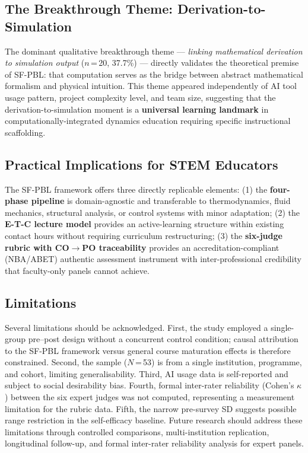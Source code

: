 \documentclass[12pt, a4paper]{article}
\begin{document}
\subsection{The Breakthrough Theme: Derivation-to-Simulation}

The dominant qualitative breakthrough theme --- \textit{linking
mathematical derivation to simulation output} ($n$\,=\,20, 37.7\%)
--- directly validates the theoretical premise of SF-PBL: that
computation serves as the bridge between abstract mathematical
formalism and physical intuition. This theme appeared independently
of AI tool usage pattern, project complexity level, and team size,
suggesting that the derivation-to-simulation moment is a
\textbf{universal learning landmark} in computationally-integrated
dynamics education requiring specific instructional scaffolding.

\subsection{Practical Implications for STEM Educators}

The SF-PBL framework offers three directly replicable elements:
(1) the \textbf{four-phase pipeline} is domain-agnostic and
transferable to thermodynamics, fluid mechanics, structural
analysis, or control systems with minor adaptation; (2) the
\textbf{E-T-C lecture model} provides an active-learning structure
within existing contact hours without requiring curriculum
restructuring; (3) the \textbf{six-judge rubric with
CO$\rightarrow$PO traceability} provides an
accreditation-compliant (NBA/ABET) authentic assessment instrument
with inter-professional credibility that faculty-only panels cannot
achieve.

\subsection{Limitations}

Several limitations should be acknowledged. First, the study
employed a single-group pre--post design without a concurrent
control condition; causal attribution to the SF-PBL framework
versus general course maturation effects is therefore constrained.
Second, the sample ($N$\,=\,53) is from a single institution,
programme, and cohort, limiting generalisability. Third, AI usage
data is self-reported and subject to social desirability bias.
Fourth, formal inter-rater reliability (Cohen's $\kappa$) between
the six expert judges was not computed, representing a measurement
limitation for the rubric data. Fifth, the narrow pre-survey SD
suggests possible range restriction in the self-efficacy baseline.
Future research should address these limitations through controlled
comparisons, multi-institution replication, longitudinal follow-up,
and formal inter-rater reliability analysis for expert panels.
\end{document}
